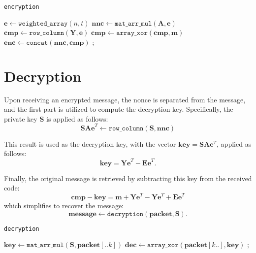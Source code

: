 \begin{algorithm}[H]
\caption{\texttt{encryption}}
\label{enc}

\DontPrintSemicolon
\SetStartEndCondition{ }{}{}
\AlgoDontDisplayBlockMarkers\SetAlgoNoEnd\SetAlgoNoLine

\BlankLine
$\mathbf{e} \leftarrow \texttt{weighted\_array}(n, t)$\;
$\mathbf{nnc} \leftarrow \texttt{mat\_arr\_mul}(\mathbf{A}, \mathbf{e})$\;
$\mathbf{cmp} \leftarrow \texttt{row\_column}(\mathbf{Y}, \mathbf{e})$\;
$\mathbf{cmp} \leftarrow \texttt{array\_xor}(\mathbf{cmp}, \mathbf{m})$\;
$\mathbf{enc} \leftarrow \texttt{concat}(\mathbf{nnc}, \mathbf{cmp})$ 
;
\end{algorithm}

\section{Decryption}
Upon receiving an encrypted message, the nonce is separated from the message, and the first part is utilized to compute the decryption key. Specifically, the private key $\mathbf{S}$ is applied as follows:
\[
\mathbf{SAe}^T \leftarrow \texttt{row\_column}(\mathbf{S}, \mathbf{nnc})
\]

This result is used as the decryption key, with the vector $\mathbf{key} = \mathbf{SA}\mathbf{e}^T$, applied as follows: \[\mathbf{key} = \mathbf{Ye}^T - \mathbf{Ee}^T.\]

Finally, the original message is retrieved by subtracting this key from the received code:
\[
\mathbf{cmp} - \mathbf{key} = \mathbf{m} + \mathbf{Ye}^T - \mathbf{Ye}^T + \mathbf{Ee}^T
\]
which simplifies to recover the message:
\[
\mathbf{message} \leftarrow \texttt{decryption}(\mathbf{packet}, \mathbf{S}).
\]

\begin{algorithm}[H]
\caption{\texttt{decryption}}
\label{dec}

\DontPrintSemicolon
\SetStartEndCondition{ }{}{}
\AlgoDontDisplayBlockMarkers\SetAlgoNoEnd\SetAlgoNoLine

\BlankLine
$\mathbf{key} \leftarrow \texttt{mat\_arr\_mul}(\mathbf{S}, \mathbf{packet}[..k])$ 
$\mathbf{dec} \leftarrow \texttt{array\_xor}(\mathbf{packet}[k..], \mathbf{key})$ 
;
\end{algorithm}

